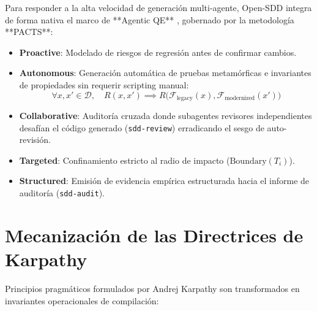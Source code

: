 \documentclass[11pt,a4paper]{article}
\begin{document}
Para responder a la alta velocidad de generación multi-agente, Open-SDD integra de forma nativa el marco de **Agentic QE** \cite{spiridonov2026agentic}, gobernado por la metodología **PACTS**:
\begin{itemize}
    \item \textbf{Proactive}: Modelado de riesgos de regresión antes de confirmar cambios.
    \item \textbf{Autonomous}: Generación automática de pruebas metamórficas e invariantes de propiedades sin requerir scripting manual:
    \begin{equation}
        \forall x, x' \in \mathcal{D}, \quad R(x, x') \implies R\bigl(\mathcal{F}_{\text{legacy}}(x), \mathcal{F}_{\text{modernized}}(x')\bigr)
    \end{equation}
    \item \textbf{Collaborative}: Auditoría cruzada donde subagentes revisores independientes desafían el código generado (\texttt{sdd-review}) erradicando el sesgo de auto-revisión.
    \item \textbf{Targeted}: Confinamiento estricto al radio de impacto ($\text{Boundary}(T_i)$).
    \item \textbf{Structured}: Emisión de evidencia empírica estructurada hacia el informe de auditoría (\texttt{sdd-audit}).
\end{itemize}

\section{Mecanización de las Directrices de Karpathy}

Principios pragmáticos formulados por Andrej Karpathy \cite{karpathy2025} son transformados en invariantes operacionales de compilación:

\begin{table}[h!]
\centering
\small
\caption{Mecanización de las Directrices de Karpathy en Open-SDD.}
\label{tab:karpathy}
\end{table}
\end{document}
